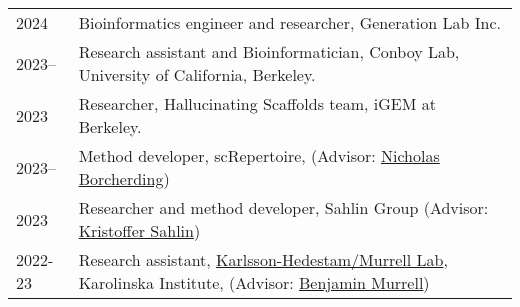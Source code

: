 
\begin{longtable}[l]{@{}p{} p{}}


    2024 & Bioinformatics engineer and researcher, Generation Lab Inc. \\

    2023-- & Research assistant and Bioinformatician, Conboy Lab, University of California, Berkeley.\\

    2023 & Researcher, Hallucinating Scaffolds team, iGEM at Berkeley. \\

    2023-- & Method developer, scRepertoire, (Advisor: \href{https://www.borch.dev/}{Nicholas Borcherding})\\

    2023 & Researcher and method developer, Sahlin Group (Advisor: \href{https://www.scilifelab.se/researchers/kristoffer-sahlin/}{Kristoffer Sahlin}) \\

    2022-23 & Research assistant, \href{https://ki.se/en/people/benjamin-murrell}{Karlsson-Hedestam/Murrell Lab}, Karolinska Institute, (Advisor: \href{https://ki.se/en/people/benjamin-murrell}{Benjamin Murrell}) \\

\end{longtable}
